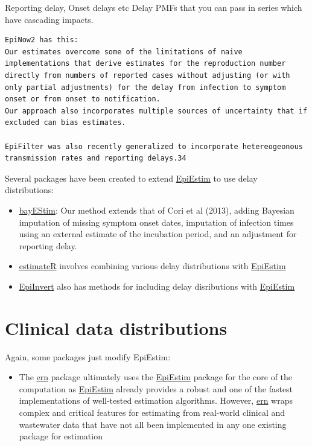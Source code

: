 \documentclass[
  letterpaper,
  DIV=11,
  numbers=noendperiod]{scrreprt}
\providecommand{\tightlist}{%
  \setlength{\itemsep}{0pt}\setlength{\parskip}{0pt}}\usepackage{longtable,booktabs,array}
\begin{document}
Reporting delay, Onset delays etc Delay PMFs that you can pass in series
which have cascading impacts.

\begin{verbatim}
EpiNow2 has this:
Our estimates overcome some of the limitations of naive implementations that derive estimates for the reproduction number directly from numbers of reported cases without adjusting (or with only partial adjustments) for the delay from infection to symptom onset or from onset to notification. 
Our approach also incorporates multiple sources of uncertainty that if excluded can bias estimates.

EpiFilter was also recently generalized to incorporate hetereogeonous transmission rates and reporting delays.34
\end{verbatim}

Several packages have been created to extend
\href{package_EpiEstim.qmd}{EpiEstim} to use delay distributions:

\begin{itemize}
\tightlist
\item
  \href{package_bayEStim.qmd}{bayEStim}: Our method extends that of Cori
  et al (2013), adding Bayesian imputation of missing symptom onset
  dates, imputation of infection times using an external estimate of the
  incubation period, and an adjustment for reporting delay.
\item
  \href{package_EstimateR.qmd}{estimateR} involves combining various
  delay distributions with \href{package_EpiEstim.qmd}{EpiEstim}
\item
  \href{package_EpiInvert.qmd}{EpiInvert} also has methods for including
  delay disributions with \href{package_EpiEstim.qmd}{EpiEstim}
\end{itemize}

\section*{Clinical data
distributions}\label{clinical-data-distributions}


Again, some packages just modify EpiEstim:

\begin{itemize}
\tightlist
\item
  The \href{package_ern.qmd}{ern} package ultimately uses the
  \href{package_EpiEstim.qmd}{EpiEstim} package for the core of the
  computation as \href{package_EpiEstim.qmd}{EpiEstim} already provides
  a robust and one of the fastest implementations of well-tested
  estimation algorithms. However, \href{package_ern.qmd}{ern} wraps
  complex and critical features for estimating from real-world clinical
  and wastewater data that have not all been implemented in any one
  existing package for estimation
\end{itemize}
\end{document}
